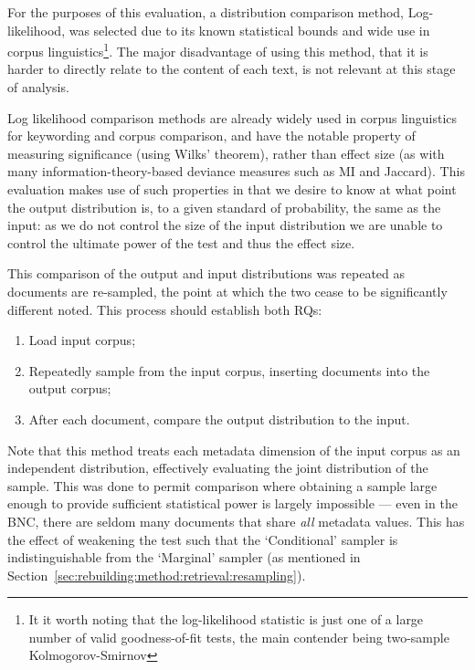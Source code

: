 For the purposes of this evaluation, a distribution comparison method, Log-likelihood, was selected due to its known statistical bounds and wide use in corpus linguistics\footnote{It it worth noting that the log-likelihood statistic is just one of a large number of valid goodness-of-fit tests, the main contender being two-sample Kolmogorov-Smirnov}.  The major disadvantage of using this method, that it is harder to directly relate to the content of each text, is not relevant at this stage of analysis.


Log likelihood comparison methods are already widely used in corpus linguistics for keywording and corpus comparison, and have the notable property of measuring significance (using Wilks' theorem), rather than effect size (as with many information-theory-based deviance measures such as MI and Jaccard).  This evaluation makes use of such properties in that we desire to know at what point the output distribution is, to a given standard of probability, the same as the input: as we do not control the size of the input distribution we are unable to control the ultimate power of the test and thus the effect size.

This comparison of the output and input distributions was repeated as documents are re-sampled, the point at which the two cease to be significantly different noted.  This process should establish both RQs:

\begin{enumerate}
    \item Load input corpus;
    \item Repeatedly sample from the input corpus, inserting documents into the output corpus;
    \item After each document, compare the output distribution to the input.
\end{enumerate}


Note that this method treats each metadata dimension of the input corpus as an independent distribution, effectively evaluating the joint distribution of the sample.  This was done to permit comparison where obtaining a sample large enough to provide sufficient statistical power is largely impossible --- even in the BNC, there are seldom many documents that share \textsl{all} metadata values.  This has the effect of weakening the test such that the `Conditional' sampler is indistinguishable from the `Marginal' sampler (as mentioned in Section~\ref{sec:rebuilding:method:retrieval:resampling}).



